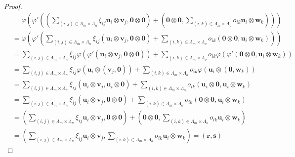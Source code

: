 \documentclass[dvipdfmx]{jsarticle}
\begin{document}
\begin{proof}
\begin{align*}
&= \varphi\left( \varphi'\left( \left( \sum_{(i,j) \in \varLambda_{m} \times \varLambda_{n}} {\xi_{ij}\mathbf{u}_{i} \otimes \mathbf{v}_{j}},\mathbf{0} \otimes \mathbf{0} \right) + \left( \mathbf{0} \otimes \mathbf{0},\sum_{(i,k) \in \varLambda_{m} \times \varLambda_{o}} {o_{ik}\mathbf{u}_{i} \otimes \mathbf{w}_{k}} \right) \right) \right)\\
&= \varphi\left( \varphi'\left( \sum_{(i,j) \in \varLambda_{m} \times \varLambda_{n}} {\xi_{ij}\left( \mathbf{u}_{i} \otimes \mathbf{v}_{j},\mathbf{0} \otimes \mathbf{0} \right)} + \sum_{(i,k) \in \varLambda_{m} \times \varLambda_{o}} {o_{ik}\left( \mathbf{0} \otimes \mathbf{0},\mathbf{u}_{i} \otimes \mathbf{w}_{k} \right)} \right) \right)\\
&= \sum_{(i,j) \in \varLambda_{m} \times \varLambda_{n}} {\xi_{ij}\varphi\left( \varphi'\left( \mathbf{u}_{i} \otimes \mathbf{v}_{j},\mathbf{0} \otimes \mathbf{0} \right) \right)} + \sum_{(i,k) \in \varLambda_{m} \times \varLambda_{o}} {o_{ik}\varphi\left( \varphi'\left( \mathbf{0} \otimes \mathbf{0},\mathbf{u}_{i} \otimes \mathbf{w}_{k} \right) \right)}\\
&= \sum_{(i,j) \in \varLambda_{m} \times \varLambda_{n}} {\xi_{ij}\varphi\left( \mathbf{u}_{i} \otimes \left( \mathbf{v}_{j},\mathbf{0} \right) \right)} + \sum_{(i,k) \in \varLambda_{m} \times \varLambda_{o}} {o_{ik}\varphi\left( \mathbf{u}_{i} \otimes \left( \mathbf{0},\mathbf{w}_{k} \right) \right)}\\
&= \sum_{(i,j) \in \varLambda_{m} \times \varLambda_{n}} {\xi_{ij}\left( \mathbf{u}_{i} \otimes \mathbf{v}_{j},\mathbf{u}_{i} \otimes \mathbf{0} \right)} + \sum_{(i,k) \in \varLambda_{m} \times \varLambda_{o}} {o_{ik}\left( \mathbf{u}_{i} \otimes \mathbf{0},\mathbf{u}_{i} \otimes \mathbf{w}_{k} \right)}\\
&= \sum_{(i,j) \in \varLambda_{m} \times \varLambda_{n}} {\xi_{ij}\left( \mathbf{u}_{i} \otimes \mathbf{v}_{j},\mathbf{0} \otimes \mathbf{0} \right)} + \sum_{(i,k) \in \varLambda_{m} \times \varLambda_{o}} {o_{ik}\left( \mathbf{0} \otimes \mathbf{0},\mathbf{u}_{i} \otimes \mathbf{w}_{k} \right)}\\
&= \left( \sum_{(i,j) \in \varLambda_{m} \times \varLambda_{n}} {\xi_{ij}\mathbf{u}_{i} \otimes \mathbf{v}_{j}},\mathbf{0} \otimes \mathbf{0} \right) + \left( \mathbf{0} \otimes \mathbf{0},\sum_{(i,k) \in \varLambda_{m} \times \varLambda_{o}} {o_{ik}\mathbf{u}_{i} \otimes \mathbf{w}_{k}} \right)\\
&= \left( \sum_{(i,j) \in \varLambda_{m} \times \varLambda_{n}} {\xi_{ij}\mathbf{u}_{i} \otimes \mathbf{v}_{j}},\sum_{(i,k) \in \varLambda_{m} \times \varLambda_{o}} {o_{ik}\mathbf{u}_{i} \otimes \mathbf{w}_{k}} \right) = \left( \mathbf{r},\mathbf{s} \right)

\end{align*}
\end{proof}
\end{document}

